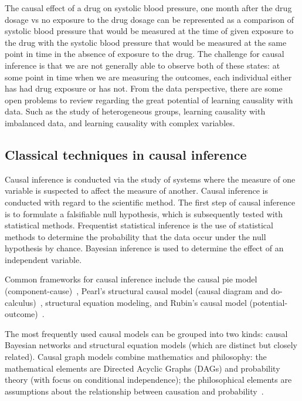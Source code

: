 The causal effect of a drug on systolic blood pressure, one month after the drug dosage vs no exposure to the drug dosage can be represented as a comparison of systolic blood pressure that would be measured at the time of given exposure to the drug with the systolic blood pressure that would be measured at the same point in time in the absence of exposure to the drug.
The challenge for causal inference is that we are not generally able to observe both of these states: at some point in time when we are measuring the outcomes, each individual either has had drug exposure or has not.
From the data perspective, there are some open problems to review regarding the great potential of learning causality with data. 
Such as the study of heterogeneous groups, learning causality with imbalanced data, and learning causality with complex variables. 

\subsection{Classical techniques in causal inference}


Causal inference is conducted via the study of systems where the measure of one variable is suspected to affect the measure of another. 
Causal inference is conducted with regard to the scientific method. 
The first step of causal inference is to formulate a falsifiable null hypothesis, which is subsequently tested with statistical methods.
Frequentist statistical inference is the use of statistical methods to determine the probability that the data occur under the null hypothesis by chance.
Bayesian inference is used to determine the effect of an independent variable.

Common frameworks for causal inference include the causal pie model (component-cause)~\cite{rothman2005causation}, Pearl's structural causal model (causal diagram and do-calculus)~\cite{pearl2000models}, structural equation modeling, and Rubin's causal model (potential-outcome)~\cite{imbens2015causal}.

The most frequently used causal models can be grouped into two kinds: causal Bayesian networks and structural equation models (which are distinct but closely related). %
Causal graph models combine mathematics and philosophy: the mathematical elements are Directed Acyclic Graphs (DAGs) and probability theory (with focus on conditional independence); the philosophical elements are assumptions about the relationship between causation and probability~\cite{spirtes2000causation}. %


